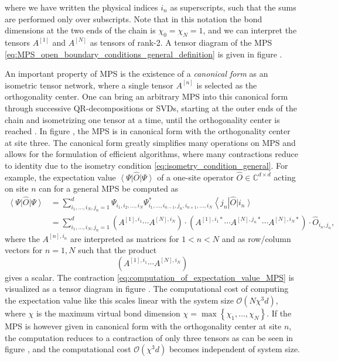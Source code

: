 where we have written the physical indices $i_n$ as superscripts, such that the sums are performed only over subscripts. Note that in this notation the bond dimensions at the two ends of the chain is $\chi_0 = \chi_{N} = 1$, and we can interpret the tensors $A^{[1]}$ and $A^{[N]}$ as tensors of rank-2. A tensor diagram of the MPS \eqref{eq:MPS_open_boundary_conditions_general_definition} is given in figure .\par
An important property of MPS is the existence of a \textit{canonical form} as an isometric tensor network, where a single tensor $A^{[n]}$ is selected as the orthogonality center. One can bring an arbitrary MPS into this canonical form through successive QR-decompositions or SVDs, starting at the outer ends of the chain and isometrizing one tensor at a time, until the orthogonality center is reached \cite{cite:DMRG_in_the_age_of_MPS}. In figure , the MPS is in canonical form with the orthogonality center at site three. The canonical form greatly simplifies many operations on MPS and allows for the formulation of efficient algorithms, where many contractions reduce to identity due to the isometry condition \eqref{eq:isometry_condition_general}. For example, the expectation value $\left\langle\Psi\right|\hat{O}\left|\Psi\right\rangle$ of a one-site operator $\hat{O} \in \mathbb{C}^{d\times d}$ acting on site $n$ can for a general MPS be computed as
\begin{equation}
\begin{split}
	\label{eq:computation_of_expectation_value_MPS}
	\left\langle\Psi\right|\hat{O}\left|\Psi\right\rangle &=\sum_{i_1,\dots,i_N,j_n=1}^{d}\Psi_{i_1,i_2,\dots,i_N} \Psi_{i_1,\dots,i_{n-1},j_n,i_{n+1},\dots,i_N}^* \left\langle j_n\right|\hat{O} \left|i_n\right\rangle \\
	&= \sum_{i_1,\dots,i_N,j_n=1}^{d} \left(A^{[1],i_1}\cdots A^{[N],i_N}\right)\cdot\left(A^{[1],i_1*}\cdots A^{[N],j_n*} \cdots A^{[N],i_N*}\right)\cdot \hat{O}_{i_n,j_n},
\end{split}
\end{equation}
where the $A^{[n],i_n}$ are interpreted as matrices for $1 < n < N$ and as row/column vectors for $n = 1, N$ such that the product
\begin{equation}
	\left(A^{[1],i_1}\cdots A^{[N],i_N}\right)
\end{equation}
gives a scalar. The contraction \eqref{eq:computation_of_expectation_value_MPS} is visualized as a tensor diagram in figure . The computational cost of computing the expectation value like this scales linear with the system size $\mathcal{O}\left(N\chi^3d\right)$, where $\chi$ is the maximum virtual bond dimension $\chi = \max\left\{\chi_1,\dots,\chi_N\right\}$. If the MPS is however given in canonical form with the orthogonality center at site $n$, the computation reduces to a contraction of only three tensors as can be seen in figure , and the computational cost $\mathcal{O}\left(\chi^3d\right)$ becomes independent of system size. \par
